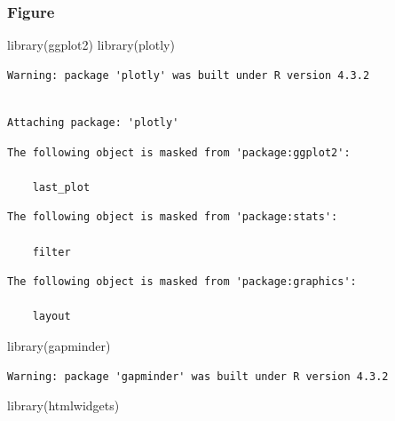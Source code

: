 \documentclass[
  letterpaper,
  DIV=11,
  numbers=noendperiod]{scrartcl}
\newenvironment{Shaded}{\begin{snugshade}}{\end{snugshade}}
\newcommand{\FunctionTok}[1]{\textcolor[rgb]{0.28,0.35,0.67}{#1}}
\newcommand{\NormalTok}[1]{\textcolor[rgb]{0.00,0.23,0.31}{#1}}
\begin{document}
\subsubsection{Figure}

\begin{Shaded}
\begin{Highlighting}[]
\FunctionTok{library}\NormalTok{(ggplot2)}
\FunctionTok{library}\NormalTok{(plotly)}
\end{Highlighting}
\end{Shaded}

\begin{verbatim}
Warning: package 'plotly' was built under R version 4.3.2
\end{verbatim}

\begin{verbatim}

Attaching package: 'plotly'
\end{verbatim}

\begin{verbatim}
The following object is masked from 'package:ggplot2':

    last_plot
\end{verbatim}

\begin{verbatim}
The following object is masked from 'package:stats':

    filter
\end{verbatim}

\begin{verbatim}
The following object is masked from 'package:graphics':

    layout
\end{verbatim}

\begin{Shaded}
\begin{Highlighting}[]
\FunctionTok{library}\NormalTok{(gapminder)}
\end{Highlighting}
\end{Shaded}

\begin{verbatim}
Warning: package 'gapminder' was built under R version 4.3.2
\end{verbatim}

\begin{Shaded}
\begin{Highlighting}[]
\FunctionTok{library}\NormalTok{(htmlwidgets)}
\end{Highlighting}
\end{Shaded}
\end{document}
